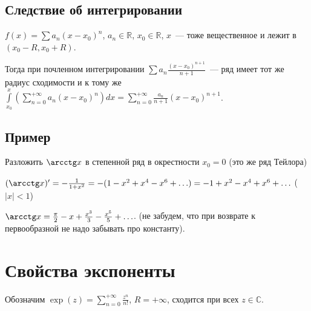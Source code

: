 \documentclass{article}
\begin{document}
        \subsection{Следствие об интегрировании}
        
            $f(x) = \sum a_n (x - x_0)^n$, $a_n \in \mathbb{R}$, $x_0 \in \mathbb{R}$, $x$~--- тоже вещественное и лежит в $(x_0 - R, x_0 + R)$.
            
            Тогда при почленном интегрировании $\sum a_n \frac{(x - x_0)^{n + 1}}{n + 1}$~--- ряд имеет тот же радиус сходимости и к тому же $\int\limits^x_{x_0} \left( \sum\limits^{+\infty}_{n = 0} a_n (x - x_0)^n \right) dx = \sum\limits^{+\infty}_{n = 0} \frac{a_n}{n + 1} (x - x_0)^{n + 1}$.
            
        \subsection{Пример}
        
            Разложить $\arcctg x$ в степенной ряд в окрестности $x_0 = 0$ (это же ряд Тейлора)
            
            $(\arcctg x)' = -\frac{1}{1 + x^2} = -(1 - x^2 + x^4 - x^6 + \ldots) = -1 + x^2 - x^4 + x^6 + \ldots$ ($|x| < 1$)
            
            $\arcctg x = \frac{\pi}{2}-x + \frac{x^3}{3} - \frac{x^5}{5} + \ldots$. (не забудем, что при возврате к первообразной не надо забывать про константу).

    \newpage
    
    \section{Свойства экспоненты}
    
        Обозначим $\exp(z) = \sum\limits^{+\infty}_{n = 0} \frac{z^n}{n!}$, $R = +\infty$, сходится при всех $z \in \mathbb{C}$.
        
\end{document}
